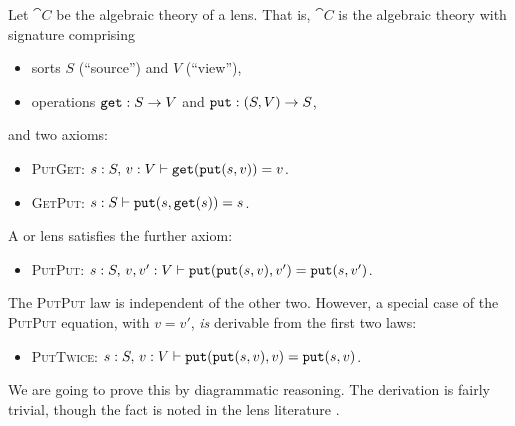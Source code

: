 \documentclass[11pt]{article}
\numberwithin{equation}{section}
\begin{document}
Let $\cat{C}$ be the algebraic theory of a  lens. That is,
$\cat{C}$ is the algebraic theory with signature comprising
\begin{itemize}[noitemsep]
  \item sorts $S$ (``source'') and $V$ (``view''),
  \item operations $\mathtt{get}: S \to V$ and $\mathtt{put}: (S, V) \to S$,
\end{itemize}
and two axioms:
\begin{itemize}[noitemsep]
  \item \textsc{PutGet}: $s: S,\, v: V \vdash \mathtt{get}(\mathtt{put}(s, v)) = v$.
  \item \textsc{GetPut}: $s: S \vdash \mathtt{put}(s, \mathtt{get}(s)) = s$.
\end{itemize}
A  or  lens satisfies the further
axiom:
\begin{itemize}
  \item \textsc{PutPut}:
    $s: S,\, v,v': V \vdash \mathtt{put}(\mathtt{put}(s, v), v') = \mathtt{put}(s, v')$.
\end{itemize}
The \textsc{PutPut} law is independent of the other two. However, a special
case of the \textsc{PutPut} equation, with $v = v'$, \emph{is} derivable from
the first two laws:
\begin{itemize}
  \item \textsc{PutTwice}:
    $s: S,\, v: V \vdash \mathtt{put}(\mathtt{put}(s, v), v) = \mathtt{put}(s, v)$.
\end{itemize}
We are going to prove this by diagrammatic reasoning. The derivation is fairly
trivial, though the fact is noted in the lens literature \cite{fischer2015}.
\end{document}
